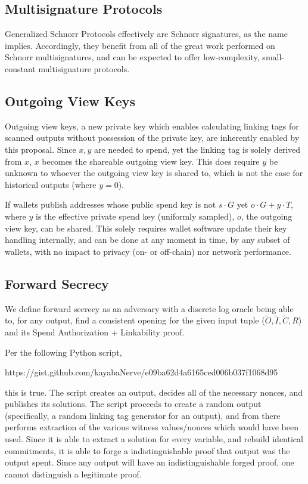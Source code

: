 \documentclass[]{article}
\begin{document}
\subsection{Multisignature Protocols}

Generalized Schnorr Protocols effectively are Schnorr signatures, as the name implies. Accordingly, they benefit from all of the great work performed on Schnorr multisignatures, and can be expected to offer low-complexity, small-constant multisignature protocols.

\subsection{Outgoing View Keys}

Outgoing view keys, a new private key which enables calculating linking tags for scanned outputs without possession of the private key, are inherently enabled by this proposal. Since $x, y$ are needed to spend, yet the linking tag is solely derived from $x$, $x$ becomes the shareable outgoing view key. This does require $y$ be unknown to whoever the outgoing view key is shared to, which is not the case for historical outputs (where $y = 0$).

If wallets publish addresses whose public spend key is not $s \cdot G$ yet $o \cdot G + y \cdot T$, where $y$ is the effective private spend key (uniformly sampled), $o$, the outgoing view key, can be shared. This solely requires wallet software update their key handling internally, and can be done at any moment in time, by any subset of wallets, with no impact to privacy (on- or off-chain) nor network performance.

\subsection{Forward Secrecy}

We define forward secrecy as an adversary with a discrete log oracle being able to, for any output, find a consistent opening for the given input tuple ($\tilde{O}, \tilde{I}, \tilde{C}, R$) and its Spend Authorization + Linkability proof.

Per the following Python script,

https://gist.github.com/kayabaNerve/e09ba62d4a6165ced006b037f1068d95

this is true. The script creates an output, decides all of the necessary nonces, and publishes its solutions. The script proceeds to create a random output (specifically, a random linking tag generator for an output), and from there performs extraction of the various witness values/nonces which would have been used. Since it is able to extract a solution for every variable, and rebuild identical commitments, it is able to forge a indistinguishable proof that output was the output spent. Since any output will have an indistinguishable forged proof, one cannot distinguish a legitimate proof.
\end{document}
